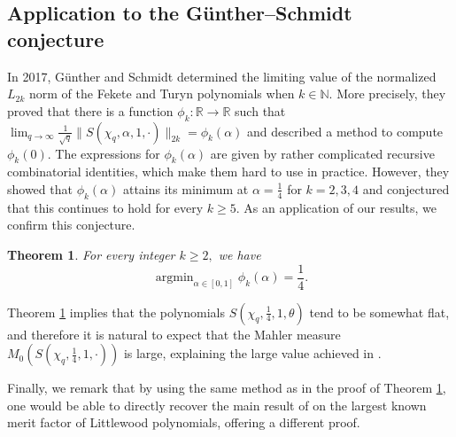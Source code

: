 \documentclass[12pt, a4paper]{amsart}
\newtheorem{theorem}{Theorem}
\theoremstyle{remark}
\begin{document}
\subsection{Application to the G\"{u}nther--Schmidt conjecture}
\phantom{M}In 2017, G\"{u}nther and Schmidt \cite{GuentherSchmidt2017} determined 
 the limiting value of the normalized $L_{2k}$ norm of the Fekete and Turyn
polynomials when $k\in\mathbb{N}$. More precisely, they proved that there is a function
$\phi_k:\mathbb{R}\to\mathbb{R}$ such that
$\lim_{q\to\infty}\frac{1}{{\sqrt{q}}}\|S(\chi_q, \alpha, 1, \cdot)\|_{2k}
=\phi_k(\alpha) $ and described a method
to compute $\phi_k(0).$ The expressions for $\phi_k(\alpha)$ are given by
rather complicated recursive combinatorial identities, which make them hard to
use in practice. However, they showed that $\phi_k(\alpha)$ attains its minimum
at $\alpha=\frac{1}{4}$ for $k=2,3,4$ and conjectured that this continues to
hold for every $k\ge 5.$ As an application of our results, we confirm this
conjecture.

\begin{theorem}\label{GSP_extremal}
    For every integer $k\ge 2,$ we have
    $$\operatorname{argmin}_{\alpha\in [0,1]}\phi_k(\alpha)=\frac{1}{4}. $$
\end{theorem}
Theorem \ref{GSP_extremal} implies that the polynomials
$S(\chi_q, \frac{1}{4}, 1, \theta)$ tend to
be somewhat flat, and therefore it is natural to expect that the Mahler
measure $M_0(S(\chi_q, \frac{1}{4}, 1, \cdot))$ is large, explaining the large value
achieved in \cite{mossinghoff-mahler}.

Finally, we remark that by using the same method as in the proof of Theorem  \ref{GSP_extremal}, one would be able to directly recover the main result of \cite{jedwab} on the largest known merit factor of Littlewood polynomials, offering a different proof.  
\end{document}

